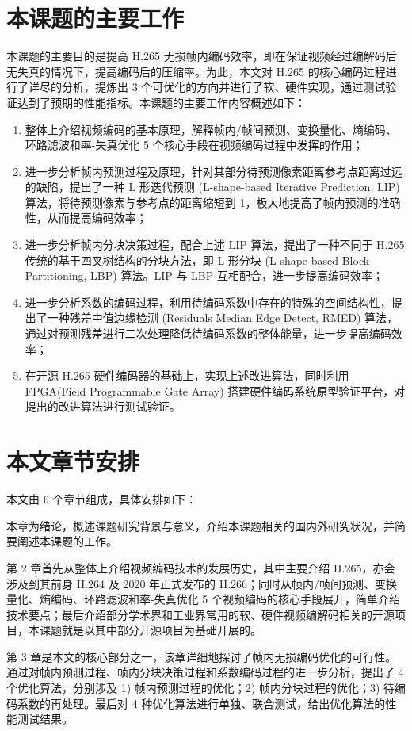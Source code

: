 \section{本课题的主要工作}
本课题的主要目的是提高 H.265 无损帧内编码效率，即在保证视频经过编解码后无失真的情况下，提高编码后的压缩率。为此，本文对 H.265 的核心编码过程进行了详尽的分析，提炼出 3 个可优化的方向并进行了软、硬件实现，通过测试验证达到了预期的性能指标。本课题的主要工作内容概述如下：
\begin{enumerate}
    \item 整体上介绍视频编码的基本原理，解释帧内/帧间预测、变换量化、熵编码、环路滤波和率-失真优化 5 个核心手段在视频编码过程中发挥的作用；
    \item 进一步分析帧内预测过程及原理，针对其部分待预测像素距离参考点距离过远的缺陷，提出了一种 L 形迭代预测 (L-shape-based Iterative Prediction, LIP) 算法，将待预测像素与参考点的距离缩短到 1，极大地提高了帧内预测的准确性，从而提高编码效率；
    \item 进一步分析帧内分块决策过程，配合上述 LIP 算法，提出了一种不同于 H.265 传统的基于四叉树结构的分块方法，即 L 形分块 (L-shape-based Block Partitioning, LBP) 算法。LIP 与 LBP 互相配合，进一步提高编码效率；
    \item 进一步分析系数的编码过程，利用待编码系数中存在的特殊的空间结构性，提出了一种残差中值边缘检测 (Residuals Median Edge Detect, RMED) 算法，通过对预测残差进行二次处理降低待编码系数的整体能量，进一步提高编码效率；
    \item 在开源 H.265 硬件编码器的基础上，实现上述改进算法，同时利用 FPGA(Field Programmable Gate Array) 搭建硬件编码系统原型验证平台，对提出的改进算法进行测试验证。
\end{enumerate}

\section{本文章节安排}
本文由 6 个章节组成，具体安排如下：

本章为绪论，概述课题研究背景与意义，介绍本课题相关的国内外研究状况，并简要阐述本课题的工作。

第 2 章首先从整体上介绍视频编码技术的发展历史，其中主要介绍 H.265，亦会涉及到其前身 H.264 及 2020 年正式发布的 H.266；同时从帧内/帧间预测、变换量化、熵编码、环路滤波和率-失真优化 5 个视频编码的核心手段展开，简单介绍技术要点；最后介绍部分学术界和工业界常用的软、硬件视频编解码相关的开源项目，本课题就是以其中部分开源项目为基础开展的。

第 3 章是本文的核心部分之一，该章详细地探讨了帧内无损编码优化的可行性。通过对帧内预测过程、帧内分块决策过程和系数编码过程的进一步分析，提出了 4 个优化算法，分别涉及 1) 帧内预测过程的优化；2) 帧内分块过程的优化；3) 待编码系数的再处理。最后对 4 种优化算法进行单独、联合测试，给出优化算法的性能测试结果。

